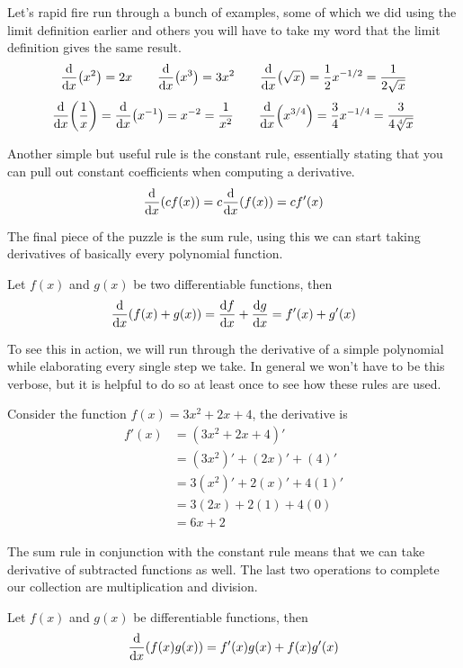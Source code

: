 \begin{example}
	Let's rapid fire run through a bunch of examples, some of which we did using the limit definition earlier and others you will have to take my word that the limit definition gives the same result.
	\[ \dv{x}(x^2) = 2x \qquad \dv{x}(x^3) = 3x^2 \qquad \dv{x}(\sqrt{x}) = \frac{1}{2}x^{-1/2} = \frac{1}{2\sqrt{x}} \]
	\[ \dv{x}(\frac{1}{x}) = \dv{x}(x^{-1}) = x^{-2} = \frac{1}{x^2} \qquad \dv{x}(x^{3/4}) = \frac{3}{4}x^{-1/4} = \frac{3}{4\sqrt[4]{x}} \]
\end{example}

Another simple but useful rule is the constant rule, essentially stating that you can pull out constant coefficients when computing a derivative.
\[ \dv{x}(cf(x)) = c \dv{x}(f(x)) = c f'(x) \]

The final piece of the puzzle is the sum rule, using this we can start taking derivatives of basically every polynomial function.

\begin{theorem}
	Let $f(x)$ and $g(x)$ be two differentiable functions, then
	\[ \dv{x}(f(x) + g(x)) = \dv{f}{x} + \dv{g}{x} = f'(x) + g'(x) \]
\end{theorem}

To see this in action, we will run through the derivative of a simple polynomial while elaborating every single step we take. In general we won't have to be this verbose, but it is helpful to do so at least once to see how these rules are used.

\begin{example}
	Consider the function $f(x) = 3x^2 + 2x + 4$, the derivative is
	\begin{align*}
		f'(x) &= (3x^2 + 2x + 4)' \\
		&= (3x^2)' + (2x)' + (4)' \\
		&= 3 (x^2)' + 2 (x)' + 4(1)' \\
		&= 3(2x) + 2(1) + 4(0) \\
		&= 6x + 2
	\end{align*}
\end{example}

The sum rule in conjunction with the constant rule means that we can take derivative of subtracted functions as well. The last two operations to complete our collection are multiplication and division.

\begin{theorem}
	Let $f(x)$ and $g(x)$ be differentiable functions, then
	\[ \dv{x}(f(x)g(x)) = f'(x)g(x) + f(x)g'(x) \]
\end{theorem}

